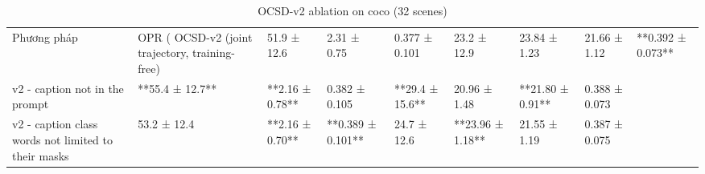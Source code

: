\begin{table}
\caption{OCSD-v2 ablation on coco (32 scenes)}
\begin{tabular}{llllllll}
\toprule
Phương pháp & OPR (%
\midrule
OCSD-v2 (joint trajectory, training-free) & 51.9 ± 12.6 & 2.31 ± 0.75 & 0.377 ± 0.101 & 23.2 ± 12.9 & 23.84 ± 1.23 & 21.66 ± 1.12 & **0.392 ± 0.073** \\
v2 - caption not in the prompt & **55.4 ± 12.7** & **2.16 ± 0.78** & 0.382 ± 0.105 & **29.4 ± 15.6** & 20.96 ± 1.48 & **21.80 ± 0.91** & 0.388 ± 0.073 \\
v2 - caption class words not limited to their masks & 53.2 ± 12.4 & **2.16 ± 0.70** & **0.389 ± 0.101** & 24.7 ± 12.6 & **23.96 ± 1.18** & 21.55 ± 1.19 & 0.387 ± 0.075 \\
\bottomrule
\end{tabular}
\end{table}
